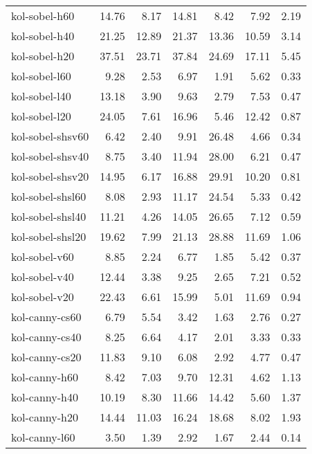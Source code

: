 \begin{tabular}{lrrrrrr}
kol-sobel-h60       &   14.76 &    8.17 &   14.81 &    8.42 &    7.92 &    2.19 \\
kol-sobel-h40       &   21.25 &   12.89 &   21.37 &   13.36 &   10.59 &    3.14 \\
kol-sobel-h20       &   37.51 &   23.71 &   37.84 &   24.69 &   17.11 &    5.45 \\
kol-sobel-l60       &    9.28 &    2.53 &    6.97 &    1.91 &    5.62 &    0.33 \\
kol-sobel-l40       &   13.18 &    3.90 &    9.63 &    2.79 &    7.53 &    0.47 \\
kol-sobel-l20       &   24.05 &    7.61 &   16.96 &    5.46 &   12.42 &    0.87 \\
kol-sobel-shsv60    &    6.42 &    2.40 &    9.91 &   26.48 &    4.66 &    0.34 \\
kol-sobel-shsv40    &    8.75 &    3.40 &   11.94 &   28.00 &    6.21 &    0.47 \\
kol-sobel-shsv20    &   14.95 &    6.17 &   16.88 &   29.91 &   10.20 &    0.81 \\
kol-sobel-shsl60    &    8.08 &    2.93 &   11.17 &   24.54 &    5.33 &    0.42 \\
kol-sobel-shsl40    &   11.21 &    4.26 &   14.05 &   26.65 &    7.12 &    0.59 \\
kol-sobel-shsl20    &   19.62 &    7.99 &   21.13 &   28.88 &   11.69 &    1.06 \\
kol-sobel-v60       &    8.85 &    2.24 &    6.77 &    1.85 &    5.42 &    0.37 \\
kol-sobel-v40       &   12.44 &    3.38 &    9.25 &    2.65 &    7.21 &    0.52 \\
kol-sobel-v20       &   22.43 &    6.61 &   15.99 &    5.01 &   11.69 &    0.94 \\
kol-canny-cs60      &    6.79 &    5.54 &    3.42 &    1.63 &    2.76 &    0.27 \\
kol-canny-cs40      &    8.25 &    6.64 &    4.17 &    2.01 &    3.33 &    0.33 \\
kol-canny-cs20      &   11.83 &    9.10 &    6.08 &    2.92 &    4.77 &    0.47 \\
kol-canny-h60       &    8.42 &    7.03 &    9.70 &   12.31 &    4.62 &    1.13 \\
kol-canny-h40       &   10.19 &    8.30 &   11.66 &   14.42 &    5.60 &    1.37 \\
kol-canny-h20       &   14.44 &   11.03 &   16.24 &   18.68 &    8.02 &    1.93 \\
kol-canny-l60       &    3.50 &    1.39 &    2.92 &    1.67 &    2.44 &    0.14 \\

\end{tabular}
